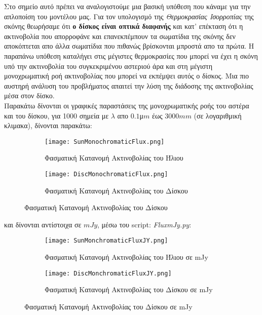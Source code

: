Στο σημείο αυτό πρέπει να αναλογιστούμε μια βασική υπόθεση που κάναμε για την απλοποίση του μοντέλου μας. Για τον υπολογισμό της {\it Θερμοκρασίας Ισορροπίας} της σκόνης θεωρήσαμε ότι {\bf ο δίσκος είναι οπτικά διαφανής} και κατ' επέκταση ότι η ακτινοβολία που απορροφάνε και επανεκπέμπουν τα σωματίδια της σκόνης δεν αποκόπτεται απο άλλα σωματίδια που πιθανώς βρίσκονται μπροστά απο τα πρώτα. Η παραπάνω υπόθεση καταλήγει στις μέγιστες θερμοκρασίες που μπορεί να έχει η σκόνη υπό την ακτινοβολία του συγκεκριμένου αστεριού άρα και στη μέγιστη μονοχρωματική ροή ακτινοβολίας που μπορεί να εκπέμψει αυτός ο δίσκος. Μια πιο αυστηρή ανάλυση του προβλήματος απαιτεί την λύση της διάδοσης της ακτινοβολίας μέσα στον δίσκο. \\

Παρακάτω δίνονται οι γραφικές παραστάσεις της μονοχρωματικής ροής του αστέρα και του δίσκου, για 1000 σημεία με $\lambda$ απο $0.1$μ$m$ έως $3000mm$ (σε λογαριθμική κλιμακα), δίνονται παρακάτω:

\begin{figure}[h]
\centering
 \begin{subfigure}{0.48\textwidth}
  \centering
  \texttt{[image: SunMonochromaticFlux.png]}
  \caption{Φασματική Κατανομή Ακτινοβολίας του Ήλιου}\label{fig:SunMonochromaticFlux}
 \end{subfigure}\hfill
 \begin{subfigure}{0.48\textwidth}
  \centering
  \texttt{[image: DiscMonochromaticFlux.png]}
  \caption{Φασματική Κατανομή Ακτινοβολίας του Δίσκου}\label{fig:DiscMonochromaticFlux}
 \end{subfigure}
\end{figure}

και δίνονται αντίστοιχα σε $mJy$, μέσω του {\en script: {\it FluxmJy.py}}:

\begin{figure}[h]
\centering
 \begin{subfigure}{0.48\textwidth}
  \centering
  \texttt{[image: SunMonchromaticFluxJY.png]}
  \caption{Φασματική Κατανομή Ακτινοβολίας του Ήλιου σε {\en mJy}}\label{fig:SunFluxJy}
 \end{subfigure}\hfill
 \begin{subfigure}{0.48\textwidth}
  \centering
  \texttt{[image: DiscMonchromaticFluxJY.png]}
  \caption{Φασματική Κατανομή Ακτινοβολίας του Δίσκου σε {\en mJy}}\label{fig:DiscFluxJy}
 \end{subfigure}
\end{figure}

